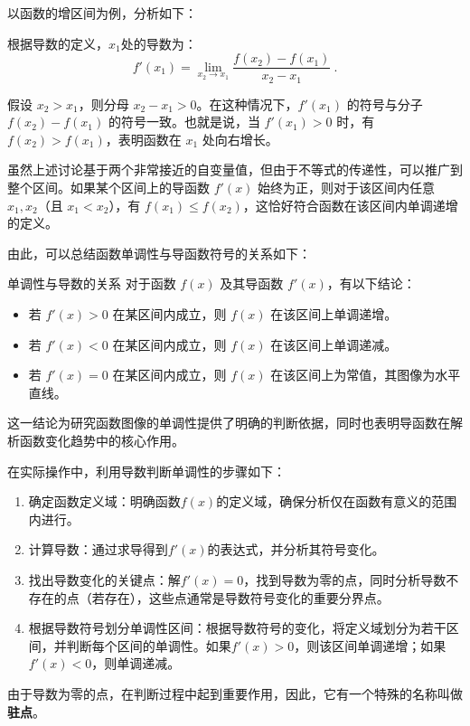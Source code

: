 以函数的增区间为例，分析如下：

根据导数的定义，$x_1$处的导数为：
\begin{equation}
f'(x_1) = \lim_{x_2 \to x_1} \frac{f(x_2) - f(x_1)}{x_2 - x_1}~.
\end{equation}

假设 $x_2 > x_1$，则分母 $x_2 - x_1 > 0$。在这种情况下，$f'(x_1)$ 的符号与分子 $f(x_2) - f(x_1)$ 的符号一致。也就是说，当 $f'(x_1) > 0$ 时，有 $f(x_2) > f(x_1)$，表明函数在 $x_1$ 处向右增长。

虽然上述讨论基于两个非常接近的自变量值，但由于不等式的传递性，可以推广到整个区间。如果某个区间上的导函数 $f'(x)$ 始终为正，则对于该区间内任意 $x_1, x_2$（且 $x_1 < x_2$），有 $f(x_1) \leq f(x_2)$，这恰好符合函数在该区间内单调递增的定义。

由此，可以总结函数单调性与导函数符号的关系如下：

\begin{theorem}{单调性与导数的关系}
对于函数 $f(x)$ 及其导函数 $f'(x)$，有以下结论：
\begin{itemize}
\item 若 $f'(x) > 0$ 在某区间内成立，则 $f(x)$ 在该区间上单调递增。
\item 若 $f'(x) < 0$ 在某区间内成立，则 $f(x)$ 在该区间上单调递减。
\item 若 $f'(x) = 0$ 在某区间内成立，则 $f(x)$ 在该区间上为常值，其图像为水平直线。
\end{itemize}
\end{theorem}

这一结论为研究函数图像的单调性提供了明确的判断依据，同时也表明导函数在解析函数变化趋势中的核心作用。

在实际操作中，利用导数判断单调性的步骤如下：
\begin{enumerate}
\item 确定函数定义域：明确函数$f(x)$的定义域，确保分析仅在函数有意义的范围内进行。
\item 计算导数：通过求导得到$f'(x)$的表达式，并分析其符号变化。
\item 找出导数变化的关键点：解$f'(x) = 0$，找到导数为零的点，同时分析导数不存在的点（若存在），这些点通常是导数符号变化的重要分界点。
\item 根据导数符号划分单调性区间：根据导数符号的变化，将定义域划分为若干区间，并判断每个区间的单调性。如果$f'(x) > 0$，则该区间单调递增；如果$f'(x) < 0$，则单调递减。
\end{enumerate}

由于导数为零的点，在判断过程中起到重要作用，因此，它有一个特殊的名称叫做\textbf{驻点}。

